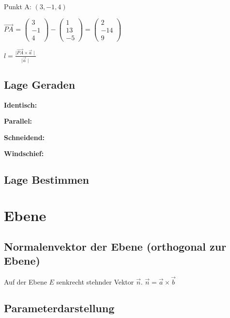 \begin{multicols*}{3}
    {Punkt A: $(3,-1,4)$}

    {$\overrightarrow{PA}$ = $\begin{pmatrix}
                3  \\
                -1 \\
                4
            \end{pmatrix} -  \begin{pmatrix}
                1  \\
                13 \\
                -5
            \end{pmatrix} =
            \begin{pmatrix}
                2   \\
                -14 \\
                9
            \end{pmatrix} $}

    {$l = \frac {\mid \overrightarrow{PA} \times\vec{a}\mid}{\mid\vec{a}\mid} $}

    \subsection{Lage Geraden}

    \textbf{Identisch:}

    \textbf{Parallel:}

    \textbf{Schneidend:}

    \textbf{Windschief:}

    \subsection{Lage Bestimmen}

    \section{Ebene}

    \subsection{Normalenvektor der Ebene (orthogonal zur Ebene)}
    {Auf der Ebene $ E $ senkrecht stehnder Vektor $\vec{n}$.}
    $\vec{n} = \vec{a} \times \vec{b}$

    \subsection{Parameterdarstellung}


\end{multicols*}
